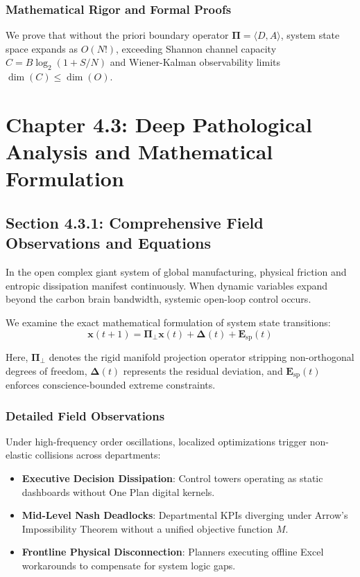\documentclass[12pt,a4paper,oneside]{book}
\begin{document}
\subsection*{Mathematical Rigor and Formal Proofs}
We prove that without the priori boundary operator $\mathbf{\Pi} = \langle D, A \rangle$, system state space expands as $O(N!)$, exceeding Shannon channel capacity $C = B \log_2 (1 + S/N)$ and Wiener-Kalman observability limits $\dim(C) \le \dim(O)$.
\clearpage
\chapter{Chapter 4.3: Deep Pathological Analysis and Mathematical Formulation}
\section{Section 4.3.1: Comprehensive Field Observations and Equations}

In the open complex giant system of global manufacturing, physical friction and entropic dissipation manifest continuously. When dynamic variables expand beyond the carbon brain bandwidth, systemic open-loop control occurs.

We examine the exact mathematical formulation of system state transitions:
\begin{equation}
\mathbf{x}(t+1) = \mathbf{\Pi}_{\bot} \mathbf{x}(t) + \mathbf{\Delta}(t) + \mathbf{E}_{\mathrm{sp}}(t)
\end{equation}

Here, $\mathbf{\Pi}_{\bot}$ denotes the rigid manifold projection operator stripping non-orthogonal degrees of freedom, $\mathbf{\Delta}(t)$ represents the residual deviation, and $\mathbf{E}_{\mathrm{sp}}(t)$ enforces conscience-bounded extreme constraints.

\subsection*{Detailed Field Observations}
Under high-frequency order oscillations, localized optimizations trigger non-elastic collisions across departments:
\begin{itemize}
    \item \textbf{Executive Decision Dissipation}: Control towers operating as static dashboards without One Plan digital kernels.
    \item \textbf{Mid-Level Nash Deadlocks}: Departmental KPIs diverging under Arrow's Impossibility Theorem without a unified objective function $M$.
    \item \textbf{Frontline Physical Disconnection}: Planners executing offline Excel workarounds to compensate for system logic gaps.
\end{itemize}
\end{document}
